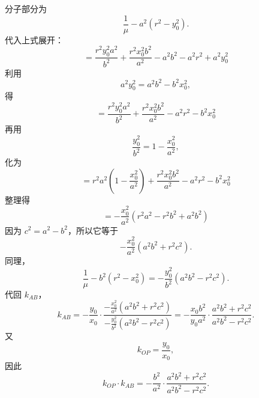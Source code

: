 \begin{solution}
分子部分为
$$\frac{1}{\mu} - a^2(r^2 - y_0^2).$$
代入上式展开：
$$= \frac{r^2 y_0^2 a^2}{b^2} + \frac{r^2 x_0^2 b^2}{a^2} - a^2 b^2 - a^2 r^2 + a^2 y_0^2$$
利用
$$a^2 y_0^2 = a^2 b^2 - b^2 x_0^2,$$
得
$$= \frac{r^2 y_0^2 a^2}{b^2} + \frac{r^2 x_0^2 b^2}{a^2} - a^2 r^2 - b^2 x_0^2$$
再用
$$\frac{y_0^2}{b^2} = 1 - \frac{x_0^2}{a^2},$$
化为
$$= r^2 a^2\left(1 - \frac{x_0^2}{a^2}\right) + \frac{r^2 x_0^2 b^2}{a^2} - a^2 r^2 - b^2 x_0^2$$
整理得
$$= -\frac{x_0^2}{a^2}(r^2 a^2 - r^2 b^2 + a^2 b^2)$$
因为 $c^2 = a^2 - b^2$，所以它等于
$$-\frac{x_0^2}{a^2}(a^2 b^2 + r^2 c^2).$$
同理，
$$\frac{1}{\mu} - b^2(r^2 - x_0^2) = -\frac{y_0^2}{b^2}(a^2 b^2 - r^2 c^2).$$
代回 $k_{AB}$，
$$k_{AB} = -\frac{y_0}{x_0} \cdot \frac{-\frac{x_0^2}{a^2}(a^2 b^2 + r^2 c^2)}{-\frac{y_0^2}{b^2}(a^2 b^2 - r^2 c^2)} = -\frac{x_0 b^2}{y_0 a^2} \cdot \frac{a^2 b^2 + r^2 c^2}{a^2 b^2 - r^2 c^2}.$$
又
$$k_{OP} = \frac{y_0}{x_0},$$
因此
$$k_{OP} \cdot k_{AB} = -\frac{b^2}{a^2} \cdot \frac{a^2 b^2 + r^2 c^2}{a^2 b^2 - r^2 c^2}.$$
\end{solution}

